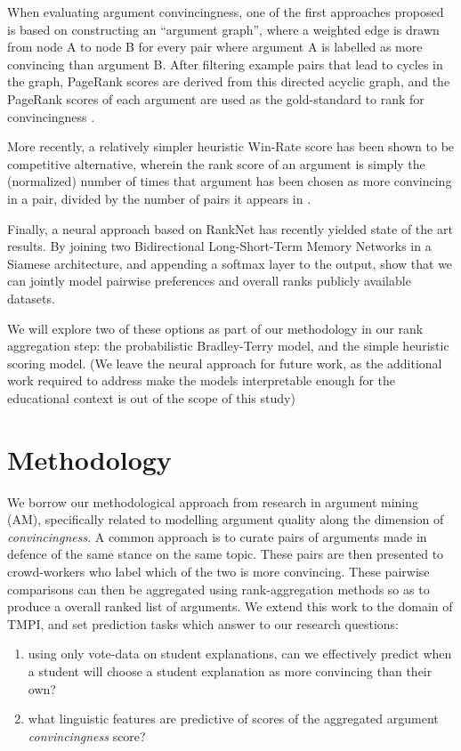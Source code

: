 \documentclass[sigconf]{acmart}
\begin{document}
When evaluating argument convincingness, one of the first approaches proposed 
is based on constructing an ``argument graph'', where a weighted edge is drawn 
from node A to node B for every pair where argument A is labelled as more 
convincing than argument B. 
After filtering example pairs that lead to cycles in the graph, PageRank scores 
are derived from this directed acyclic graph, and the PageRank 
scores of each argument are used as the gold-standard to rank for 
convincingness \cite{habernal_which_2016}.

More recently, a relatively simpler heuristic Win-Rate score has been shown to 
be competitive alternative, wherein the rank score of an argument is simply the 
(normalized) number of times that argument has been chosen as more convincing 
in a pair, divided by the number of pairs it appears in
\cite{potash_ranking_2019}.

Finally, a neural approach based on RankNet has recently yielded state of the 
art results. By joining two Bidirectional Long-Short-Term Memory Networks in a 
Siamese architecture, and appending a softmax layer to the output, 
\cite{gleize_are_2019} show that we can jointly model pairwise preferences and 
overall ranks publicly available datasets.

We will explore two of these options as part of our methodology in our rank 
aggregation step: the probabilistic Bradley-Terry model, and the simple 
heuristic scoring model. 
(We leave the neural approach for future work, as the additional work required 
to address make the models interpretable enough for the educational context is 
out of the scope of this study)


\section{Methodology}

We borrow our methodological approach from research in argument mining (AM), 
specifically related to modelling argument quality along the 
dimension of \textit{convincingness}.
A common approach is to curate pairs of arguments made in defence of the same 
stance on the same topic.
These pairs are then presented to crowd-workers who label which of the two is 
more convincing. 
These pairwise comparisons can then be aggregated using rank-aggregation 
methods so as to produce a overall ranked list of arguments.
We extend this work to the domain of TMPI, and set prediction tasks which 
answer to our research questions: 
\begin{enumerate}
	\item using only vote-data on student explanations, can we effectively 
	predict when a student will choose a student explanation as more convincing 
	than their own?
	\item what linguistic features are predictive of scores of the aggregated 
	argument \textit{convincingness} score?
\end{enumerate}
\end{document}
